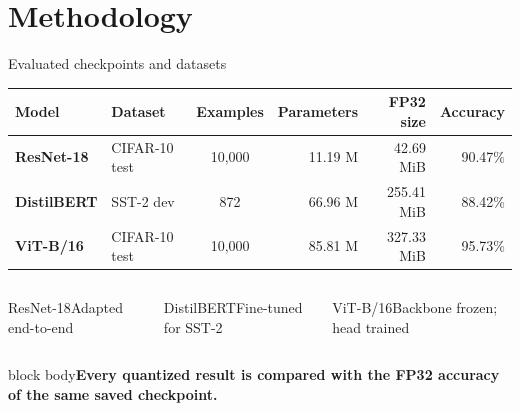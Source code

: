 \documentclass[aspectratio=169,10pt]{beamer}
\newcommand{\takeaway}[1]{\vfill\begin{beamercolorbox}[wd=\textwidth,sep=1.5mm,rounded=true]{block body}\centering\small\bfseries #1\end{beamercolorbox}}
\begin{document}
\section{Methodology}
\begin{frame}{Evaluated checkpoints and datasets}
\begin{center}
\renewcommand{\arraystretch}{1.65}
\setlength{\tabcolsep}{3.2pt}
\small
\begin{tabular}{>{\bfseries}l l c r r r}
\toprule
Model & Dataset & Examples & Parameters & FP32 size & Accuracy\\
\midrule
ResNet-18 & CIFAR-10 test & 10,000 & 11.19 M & 42.69 MiB & 90.47\%\\
DistilBERT & SST-2 dev & 872 & 66.96 M & 255.41 MiB & 88.42\%\\
ViT-B/16 & CIFAR-10 test & 10,000 & 85.81 M & 327.33 MiB & 95.73\%\\
\bottomrule
\end{tabular}
\end{center}
\vspace{3mm}
\begin{columns}[T,onlytextwidth]
\begin{block}{ResNet-18}\centering\scriptsize Adapted end-to-end\end{block}
\begin{block}{DistilBERT}\centering\scriptsize Fine-tuned for SST-2\end{block}
\begin{block}{ViT-B/16}\centering\scriptsize Backbone frozen; head trained\end{block}
\end{columns}
\takeaway{Every quantized result is compared with the FP32 accuracy of the same saved checkpoint.}
\end{frame}
\end{document}
